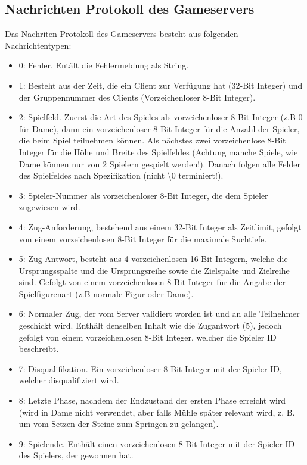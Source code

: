 \documentclass[12pt,a4paper,bibliography=totocnumbered,listof=totocnumbered]{article}
\begin{document}
\begin{appendix}
\section{Nachrichten Protokoll des Gameservers}
\label{apx:Protokoll}
Das Nachriten Protokoll des Gameservers besteht aus folgenden Nachrichtentypen:
\begin{itemize}
    \item 0: Fehler. Entält die Fehlermeldung als String.
    \item 1: Besteht aus der Zeit, die ein Client zur Verfügung hat (32-Bit Integer) und der Gruppennummer des Clients (Vorzeichenloser 8-Bit Integer).
    \item 2: Spielfeld. Zuerst die Art des Spieles als vorzeichenloser 8-Bit Integer (z.B 0 für Dame), dann ein vorzeichenloser 8-Bit Integer für die Anzahl der Spieler, die 
    beim Spiel teilnehmen können. Als nächstes zwei vorzeichenlose 8-Bit Integer für die Höhe und Breite des Spielfeldes 
    (Achtung manche Spiele, wie Dame können nur von 2 Spielern gespielt werden!).
    Danach folgen alle Felder des Spielfeldes nach Spezifikation (nicht \textbackslash0 terminiert!).
    \item 3: Spieler-Nummer als vorzeichenloser 8-Bit Integer, die dem Spieler zugewiesen wird.
    \item 4: Zug-Anforderung, bestehend aus einem 32-Bit Integer als Zeitlimit, gefolgt von einem vorzeichenlosen 8-Bit Integer für die maximale Suchtiefe.
    \item 5: Zug-Antwort, besteht aus 4 vorzeichenlosen 16-Bit Integern, welche die Ursprungsspalte und die Ursprungsreihe sowie die Zielspalte und Zielreihe sind.
    Gefolgt von einem vorzeichenlosen 8-Bit Integer für die Angabe der Spielfigurenart (z.B normale Figur oder Dame).
    \item 6: Normaler Zug, der vom Server validiert worden ist und an alle Teilnehmer geschickt wird. Enthält denselben Inhalt wie die Zugantwort (5), jedoch 
    gefolgt von einem vorzeichenlosen 8-Bit Integer, welcher die Spieler ID beschreibt.
    \item 7: Disqualifikation. Ein vorzeichenloser 8-Bit Integer mit der Spieler ID, welcher disqualifiziert wird.
    \item 8: Letzte Phase, nachdem der Endzustand der ersten Phase erreicht wird (wird in Dame nicht verwendet, aber falls Mühle später relevant wird, z. B. um vom Setzen 
    der Steine zum Springen zu gelangen).
    \item 9: Spielende. Enthält einen vorzeichenlosen 8-Bit Integer mit der Spieler ID des Spielers, der gewonnen hat.
\end{itemize}


\end{appendix}
\end{document}
